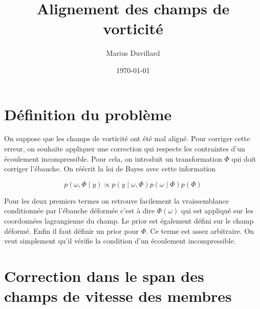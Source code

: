 \documentclass{article}
\newcommand{\norm}[1]{\left\lVert #1 \right\rVert}
\begin{document}
\title{Alignement des champs de vorticité}
\author{Marius Duvillard}
\date{\today}
\maketitle


\section{Définition du problème}
On suppose que les champs de vorticité ont été mal aligné. Pour corriger cette erreur, on souhaite appliquer une correction qui respecte les contraintes d'un écoulement incompressible. Pour cela, on introduit un transformation $\Phi$ qui doit corriger l'ébauche.
On réécrit la loi de Bayes avec cette information

\begin{equation*}
    p(\omega,\Phi \mid y) \propto p(y \mid \omega, \Phi) p(\omega \mid \Phi) p(\Phi)
\end{equation*}

Pour les deux premiers termes on retrouve facilement la vraissemblance conditionnée par l'ébauche déformée c'est à dire $\Phi(\omega)$ qui est appliqué sur les coordonnées lagrangienne du champ.
Le prior est également défini sur le champ déformé. Enfin il faut définir un prior pour $\Phi$. Ce terme est assez arbitraire. On veut simplement qu'il vérifie la condition d'un écoulement incompressible.





\section{Correction dans le span des champs de vitesse des membres}
\end{document}
